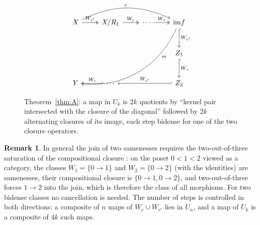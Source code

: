 \documentclass[11pt]{amsart}
\theoremstyle{definition}
\newtheorem{rem}[thm]{Remark}
\newcommand{\im}{\mathrm{im}}
\begin{document}
\begin{figure}[ht]
\[
\begin{tikzcd}[column sep=normal,row sep=large]
X\arrow[r,two heads,"W_{c'}"]\arrow[rrr,bend left=25,"e"] & X/R_1\arrow[r,two heads,"W_c"] & \cdots\arrow[r,two heads,"W_c"] & \im f\arrow[d,hook,"W_{c'}"]\arrow[ddlll,bend left=35,"m"{near start}]\\
& & & Z_1\arrow[d,hook,"W_c"]\\
Y & \cdots\arrow[l,hook',"W_c"'] & & Z_2\arrow[ll,hook',"W_{c'}"']
\end{tikzcd}
\]
\caption{Theorem~\ref{thm:A}: a map in $U_k$ is $2k$ quotients by ``kernel
pair intersected with the closure of the diagonal'' followed by $2k$
alternating closures of its image, each step bidense for one of the two
closure operators.}
\end{figure}

\begin{rem}\label{rem:cancel}
In general the join of two samenesses requires the two-out-of-three
saturation of the compositional closure \cite{Same}: on the poset $0<1<2$
viewed as a category, the classes $W_1=\{0\to1\}$ and $W_2=\{0\to2\}$ (with
the identities) are samenesses, their compositional closure is
$\{0\to1,0\to2\}$, and two-out-of-three forces $1\to2$ into the join, which
is therefore the class of all morphisms. For two bidense classes no
cancellation is needed. The number of steps is controlled in both
directions: a composite of $n$ maps of $W_c\cup W_{c'}$ lies in $U_n$, and a
map of $U_k$ is a composite of $4k$ such maps.
\end{rem}
\end{document}
